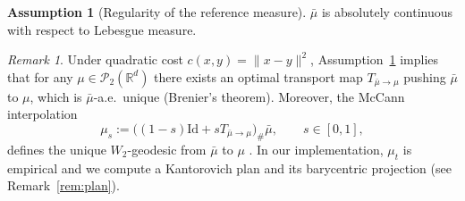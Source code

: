 \documentclass{article}
\newcommand{\eg}{\textit{e.g.}, \xspace}
\theoremstyle{plain}
\theoremstyle{definition}
\newtheorem{assumption}[theorem]{Assumption}
\theoremstyle{remark}
\newtheorem{remark}[theorem]{Remark}
\begin{document}
\begin{assumption}[Regularity of the reference measure]\label{assump:ref_ac}
$\bar{\mu}$ is absolutely continuous with respect to Lebesgue measure.
\end{assumption}

\begin{remark}
Under quadratic cost $c(x,y)=\|x-y\|^2$, Assumption~\ref{assump:ref_ac} implies that for any
$\mu\in\mathcal{P}_2(\mathbb{R}^d)$ there exists an optimal transport map
$T_{\bar{\mu}\to\mu}$ pushing $\bar{\mu}$ to $\mu$, which is $\bar{\mu}$-a.e.\ unique (Brenier's theorem).
Moreover, the McCann interpolation
\[
\mu_s := \big((1-s)\mathrm{Id}+sT_{\bar{\mu}\to\mu}\big)_{\#}\bar{\mu},\qquad s\in[0,1],
\]
defines the unique $W_2$-geodesic from $\bar{\mu}$ to $\mu$
\citep{brenier1991polar,villani2008optimal}.
In our implementation, $\mu_t$ is empirical and we compute a Kantorovich plan and its barycentric projection (see Remark~\ref{rem:plan}).
\end{remark}



\end{document}
